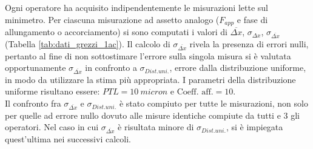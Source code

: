 \documentclass[a4paper,11pt,oneside]{article}
\begin{document}
Ogni operatore ha acquisito indipendentemente le misurazioni lette sul minimetro. Per ciascuna misurazione ad assetto analogo ($F_{app}$ e fase di allungamento o accorciamento) si sono computati i valori di $\overline{\Delta x}$, $\sigma_{\Delta x}$, $\sigma_{\overline{\Delta x}}$ (Tabella \ref{tab:dati_grezzi_1ac}).
Il calcolo di $\sigma_{\overline{\Delta x}}$ rivela la presenza di errori nulli, pertanto al fine di non sottostimare l'errore sulla singola misura si è valutata opportunamente $\sigma_{\overline{\Delta x}}$ in confronto a $\sigma_{Dist. uni.}$, errore dalla distribuzione uniforme, in modo da utilizzare la stima più appropriata. I parametri della distribuzione uniforme risultano essere: $PTL= \SI{10}{micron}$ e $\text{Coeff. aff.}=\num{10}$.\\
Il confronto fra $\sigma_{\overline{\Delta x}}$ e $\sigma_{Dist. uni.}$ è stato compiuto per tutte le misurazioni, non solo per quelle ad errore nullo dovuto alle misure identiche compiute da tutti e 3 gli operatori. Nel caso in cui $\sigma_{\overline{\Delta x}}$ è risultata minore di $\sigma_{Dist. uni.}$, si è impiegata quest'ultima nei successivi calcoli.\\%
\end{document}
